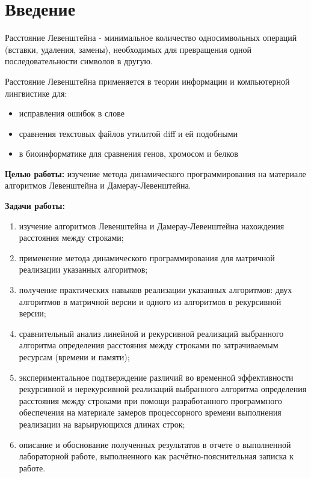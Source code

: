 \chapter*{Введение}


Расстояние Левенштейна - минимальное количество односимвольных операций (вставки, удаления, замены), необходимых для превращения одной последовательности символов в другую.

Расстояние Левенштейна применяется в теории информации и
компьютерной лингвистике для:

\begin{itemize}
    \setlength{\itemsep}{0em}
    \item исправления ошибок в слове
    \item сравнения текстовых файлов утилитой diff и ей подобными
    \item в биоинформатике для сравнения генов, хромосом и белков
\end{itemize}


\textbf{Целью работы:} изучение метода динамического программирования на материале алгоритмов Левенштейна и
Дамерау-Левенштейна.

\textbf{Задачи работы:}

\begin{enumerate}
    \setlength{\itemsep}{0em}
    \item изучение алгоритмов Левенштейна и Дамерау-Левенштейна нахождения
расстояния между строками;
    \item применение метода динамического программирования для матричной
реализации указанных алгоритмов;
    \item получение практических навыков реализации указанных алгоритмов:
двух алгоритмов в матричной версии и одного из алгоритмов
в рекурсивной версии;
    \item сравнительный анализ линейной и рекурсивной реализаций выбранного
алгоритма определения расстояния между строками по затрачиваемым
ресурсам (времени и памяти);
    \item экспериментальное подтверждение различий во временной
    эффективности рекурсивной и нерекурсивной реализаций выбранного алгоритма
определения расстояния между строками при помощи разработанного
программного обеспечения на материале замеров процессорного
времени выполнения реализации на варьирующихся длинах строк;
    \item описание и обоснование полученных результатов в отчете о
выполненной лабораторной работе, выполненного как расчётно-пояснительная
записка к работе.
\end{enumerate}
